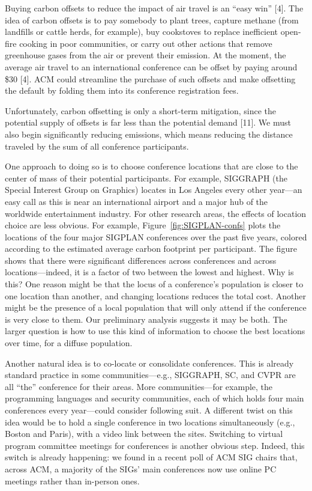 \documentclass[12pt]{article}
\begin{document}
Buying carbon offsets to reduce the impact of air travel is an ``easy win''
[4].  The idea of carbon offsets is to pay somebody to plant trees, capture
methane (from landfills or cattle herds, for example), buy cookstoves to
replace inefficient open-fire cooking in poor communities, or carry out
other actions that remove greenhouse gases from the air or prevent their
emission. At the moment, the average air travel to an international
conference can be offset by paying around \$30 [4].  ACM could streamline
the purchase of such offsets and make offsetting the default by folding them
into its conference registration fees.

Unfortunately, carbon offsetting is only a short-term mitigation, since the
potential supply of offsets is far less than the potential demand [11]. We
must also begin significantly reducing emissions, which means reducing the
distance traveled by the sum of all conference participants.

One approach to doing so is to choose conference locations that are close to
the center of mass of their potential participants.  For example, SIGGRAPH
(the Special Interest Group on Graphics) locates in Los Angeles every other
year---an easy call as this is near an international airport and a major hub
of the worldwide entertainment industry. For other research areas, the
effects of location choice are less obvious. For example,
Figure~\ref{fig:SIGPLAN-confs} plots the 
locations of the four major SIGPLAN conferences over the past five years,
colored according to the estimated average carbon footprint per
participant. The figure shows that there were significant differences across
conferences and across locations---indeed, it is a factor of two between the
lowest and highest. Why is this? One reason might be that the locus of a
conference’s population is closer to one location than another, and changing
locations reduces the total cost. Another might be the presence of a local
population that will only attend if the conference is very close to
them. Our preliminary analysis suggests it may be both. The larger question
is how to use this kind of information to choose the best locations over
time, for a diffuse population.

Another natural idea is to co-locate or consolidate conferences.  This is
already standard practice in some communities---e.g., SIGGRAPH, SC, and CVPR
are all ``the'' conference for their areas.  More communities---for example,
the programming languages and security communities, each of which holds four
main conferences every year---could consider following suit.  A different
twist on this idea would be to hold a single conference in two locations
simultaneously (e.g., Boston and Paris), with a video link between the
sites. Switching to virtual program committee meetings for conferences is
another obvious step.  Indeed, this switch is already happening: we found in
a recent poll of ACM SIG chairs that, across ACM, a majority of the SIGs’
main conferences now use online PC meetings rather than in-person ones.
\end{document}
